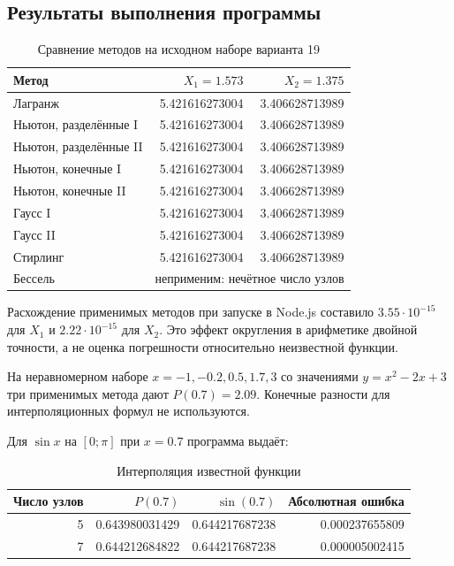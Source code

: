 \documentclass[12pt,a4paper]{article}
\begin{document}


\clearpage
\subsection{Результаты выполнения программы}
\begin{table}[H]\centering\small
\caption{Сравнение методов на исходном наборе варианта 19}
\begin{tabular}{lrr}\toprule
Метод & $X_1=1.573$ & $X_2=1.375$\\\midrule
Лагранж & 5.421616273004 & 3.406628713989\\
Ньютон, разделённые I & 5.421616273004 & 3.406628713989\\
Ньютон, разделённые II & 5.421616273004 & 3.406628713989\\
Ньютон, конечные I & 5.421616273004 & 3.406628713989\\
Ньютон, конечные II & 5.421616273004 & 3.406628713989\\
Гаусс I & 5.421616273004 & 3.406628713989\\
Гаусс II & 5.421616273004 & 3.406628713989\\
Стирлинг & 5.421616273004 & 3.406628713989\\
Бессель & \multicolumn{2}{c}{неприменим: нечётное число узлов}\\\bottomrule
\end{tabular}\end{table}
Расхождение применимых методов при запуске в Node.js составило
$3.55\cdot10^{-15}$ для $X_1$ и $2.22\cdot10^{-15}$ для $X_2$.
Это эффект округления в арифметике двойной точности, а не оценка погрешности
относительно неизвестной функции.

На неравномерном наборе $x=-1,-0.2,0.5,1.7,3$ со значениями
$y=x^2-2x+3$ три применимых метода дают $P(0.7)=2.09$.
Конечные разности для интерполяционных формул не используются.

Для $\sin x$ на $[0;\pi]$ при $x=0.7$ программа выдаёт:
\begin{table}[H]
\centering
\small
\caption{Интерполяция известной функции}
\begin{tabular}{rrrr}
\toprule
Число узлов & $P(0.7)$ & $\sin(0.7)$ & Абсолютная ошибка \\
\midrule
5 & 0.643980031429 & 0.644217687238 & 0.000237655809 \\
7 & 0.644212684822 & 0.644217687238 & 0.000005002415 \\
\bottomrule
\end{tabular}
\end{table}
\end{document}
